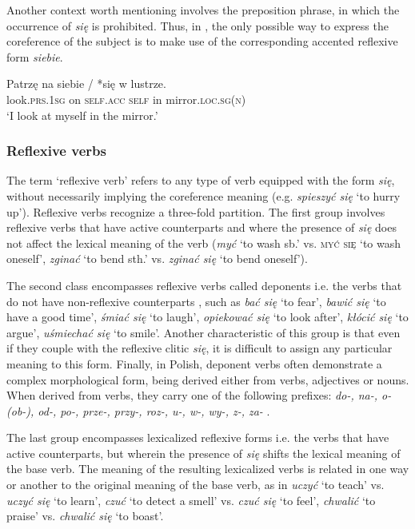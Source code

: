 \documentclass[output=paper]{langscibook}
\begin{document}
Another context worth mentioning involves the preposition phrase, in which the occurrence of \textit{się} is prohibited. Thus, in , the only possible way to express the coreference of the subject is to make use of the corresponding accented reflexive form \textit{siebie}.

\ea \label{ex:Janic:28}
\gll Patrzę		 na	siebie	/	 *się	 w	lustrze.\\
	 look.\textsc{prs.1sg}	on	\textsc{self.acc} { }	\textsc{self}	in	mirror.\textsc{loc.sg(n)}\\
\glt ‘I look at myself in the mirror.’			
\z 

\subsubsection{Reflexive verbs} \label{sec:Janic:3.2.4}

The term ‘reflexive verb’ refers to any type of verb equipped with the form \textit{się}, without necessarily implying the coreference meaning (e.g. \textit{spieszyć się} ‘to hurry up’). Reflexive verbs recognize a three-fold partition. The first group involves reflexive verbs that have active counterparts and where the presence of \textit{się} does not affect the lexical meaning of the verb (\textit{myć} ‘to wash sb.’ vs. \textsc{myć się} ‘to wash oneself’, \textit{zginać} ‘to bend sth.’ vs. \textit{zginać się} ‘to bend oneself’). 

The second class encompasses reflexive verbs called deponents i.e. the verbs that do not have non-reflexive counterparts \citep[251]{Kemmer1993}, such as \textit{bać się} ‘to fear’, \textit{bawić się} ‘to have a good time’, \textit{śmiać się} ‘to laugh’, \textit{opiekować się} ‘to look after’, \textit{kłócić się} ‘to argue’, \textit{uśmiechać się} ‘to smile’. Another characteristic of this group is that even if they couple with the reflexive clitic \textit{się}, it is difficult to assign any particular meaning to this form. Finally, in Polish, deponent verbs often demonstrate a complex morphological form, being derived either from verbs, adjectives or nouns. When derived from verbs, they carry one of the following prefixes: \textit{do-, na-, o-(ob-), od-, po-, prze-, przy-, roz-, u-, w-, wy-, z-, za-} \citep[256]{Brooks1975}.

The last group encompasses lexicalized reflexive forms i.e. the verbs that have active counterparts, but wherein the presence of \textit{się} shifts the lexical meaning of the base verb. The meaning of the resulting lexicalized verbs is related in one way or another to the original meaning of the base verb, as in \textit{uczyć} ‘to teach’ vs. \textit{uczyć się} ‘to learn’, \textit{czuć} ‘to detect a smell’ vs. \textit{czuć się} ‘to feel’, \textit{chwalić} ‘to praise’ vs. \textit{ chwalić się }‘to boast’.
\end{document}
